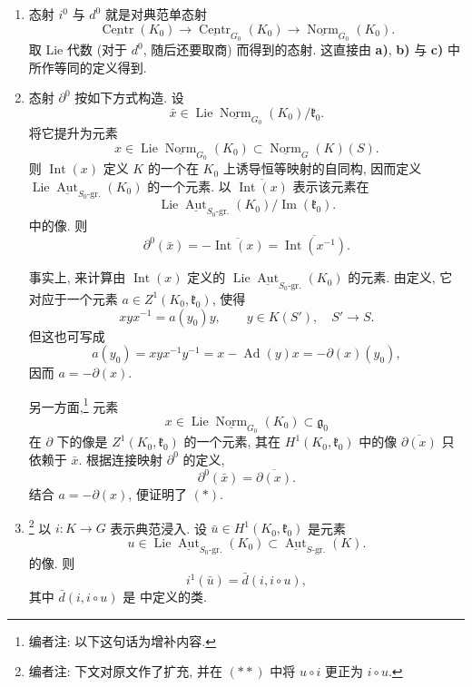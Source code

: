 \begin{enumerate}
\item[\textbf{1)}]
态射 \(i^0\) 与 \(d^0\) 就是对典范单态射
\[
 \underline{\operatorname{Centr}}(K_0)
 \longrightarrow
 \underline{\operatorname{Centr}}_{G_0}(K_0)
 \longrightarrow
 \underline{\operatorname{Norm}}_{G_0}(K_0).
\]
取 Lie 代数 (对于 \(d^0\), 随后还要取商) 而得到的态射.
这直接由 \textbf{a)}, \textbf{b)} 与 \textbf{c)} 中所作等同的定义得到.

\item[\textbf{2)}]
态射 \(\partial^0\) 按如下方式构造. 设
\[
 \bar x\in
 \operatorname{Lie}\underline{\operatorname{Norm}}_{G_0}(K_0)
 /\mathfrak k_0.
\]
将它提升为元素
\[
 x\in\operatorname{Lie}\underline{\operatorname{Norm}}_{G_0}(K_0)
 \subset\underline{\operatorname{Norm}}_G(K)(S).
\]
则 \(\operatorname{Int}(x)\) 定义 \(K\) 的一个在 \(K_0\) 上诱导恒等映射的自同构,
因而定义 \(\operatorname{Lie}\underline{\operatorname{Aut}}_{S_0\text{-gr.}}(K_0)\)
的一个元素. 以 \(\overline{\operatorname{Int}(x)}\) 表示该元素在
\[
 \operatorname{Lie}\underline{\operatorname{Aut}}_{S_0\text{-gr.}}(K_0)
 /\operatorname{Im}(\mathfrak k_0).
\]
中的像. 则
\begin{equation}
 \partial^0(\bar x)
 =-\overline{\operatorname{Int}(x)}
 =\overline{\operatorname{Int}(x^{-1})}.
 \tag{*}\label{sga3:iii:paragraph:4-38:equation:star}
\end{equation}

事实上, 来计算由 \(\operatorname{Int}(x)\) 定义的
\(\operatorname{Lie}\underline{\operatorname{Aut}}_{S_0\text{-gr.}}(K_0)\) 的元素.
由定义, 它对应于一个元素 \(a\in Z^1(K_0,\mathfrak k_0)\), 使得
\[
 xyx^{-1}=a(y_0)y,
 \qquad y\in K(S'),\quad S'\longrightarrow S.
\]
但这也可写成
\[
 a(y_0)=xyx^{-1}y^{-1}=x-\operatorname{Ad}(y)x
 =-\partial(x)(y_0),
\]
因而 \(a=-\partial(x)\).

另一方面,\footnote{编者注: 以下这句话为增补内容.} 元素
\[
 x\in\operatorname{Lie}\underline{\operatorname{Norm}}_{G_0}(K_0)
 \subset\mathfrak g_0
\]
在 \(\partial\) 下的像是 \(Z^1(K_0,\mathfrak k_0)\) 的一个元素,
其在 \(H^1(K_0,\mathfrak k_0)\) 中的像 \(\overline{\partial(x)}\)
只依赖于 \(\bar x\). 根据连接映射 \(\partial^0\) 的定义,
\[
 \partial^0(\bar x)=\overline{\partial(x)}.
\]
结合 \(a=-\partial(x)\), 便证明了 \((*)\).

\item[\textbf{3)}]
\footnote{编者注: 下文对原文作了扩充,
并在 \((**)\) 中将 \(u\circ i\) 更正为 \(i\circ u\).}
以 \(i:K\to G\) 表示典范浸入.
设 \(\bar u\in H^1(K_0,\mathfrak k_0)\) 是元素
\[
 u\in
 \operatorname{Lie}\underline{\operatorname{Aut}}_{S_0\text{-gr.}}(K_0)
 \subset\underline{\operatorname{Aut}}_{S\text{-gr.}}(K).
\]
的像. 则
\begin{equation}
 i^1(\bar u)=\bar d(i,i\circ u),
 \tag{**}\label{sga3:iii:paragraph:4-38:equation:double-star}
\end{equation}
其中 \(\bar d(i,i\circ u)\) 是  中定义的类.


\end{enumerate}
